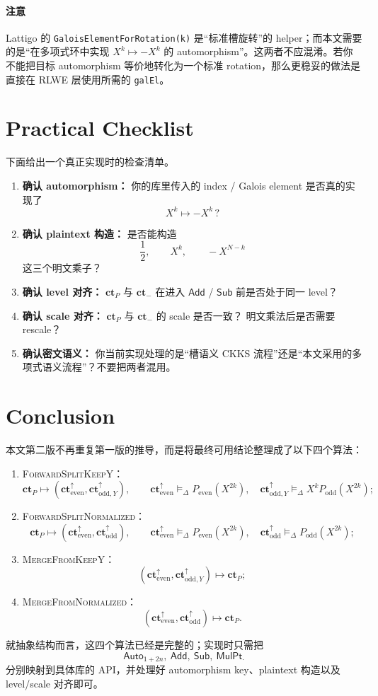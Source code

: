 \documentclass[11pt,a4paper]{ctexart}
\newcommand{\Auto}[1]{\mathsf{Auto}_{#1}}
\newcommand{\Add}{\mathsf{Add}}
\newcommand{\Sub}{\mathsf{Sub}}
\newcommand{\MulPt}[1]{\mathsf{MulPt}_{#1}}
\newcommand{\rep}{\mathrel{\vDash_{\Delta}}}
\newcommand{\ctP}{\mathbf{ct}_{P}}
\newcommand{\ctm}{\mathbf{ct}_{-}}
\newcommand{\cte}{\mathbf{ct}_{\mathrm{even}}^{\uparrow}}
\newcommand{\ctoy}{\mathbf{ct}_{\mathrm{odd},Y}^{\uparrow}}
\newcommand{\cto}{\mathbf{ct}_{\mathrm{odd}}^{\uparrow}}
\newcommand{\Pe}{P_{\mathrm{even}}}
\newcommand{\Po}{P_{\mathrm{odd}}}
\begin{document}
\paragraph{注意}
Lattigo 的 \texttt{GaloisElementForRotation(k)} 是“标准槽旋转”的 helper；而本文需要的是“在多项式环中实现 \(X^k\mapsto -X^k\) 的 automorphism”。这两者不应混淆。若你不能把目标 automorphism 等价地转化为一个标准 rotation，那么更稳妥的做法是直接在 RLWE 层使用所需的 \texttt{galEl}。

\section{Practical Checklist}

下面给出一个真正实现时的检查清单。

\begin{enumerate}[label=\textbf{C\arabic*.}]
    \item \textbf{确认 automorphism：}  
    你的库里传入的 index / Galois element 是否真的实现了
    \[
    X^k \mapsto -X^k \, ?
    \]

    \item \textbf{确认 plaintext 构造：}  
    是否能构造
    \[
    \frac12,\qquad X^k,\qquad -X^{N-k}
    \]
    这三个明文乘子？

    \item \textbf{确认 level 对齐：}  
    \(\ctP\) 与 \(\ctm\) 在进入 \(\Add\) / \(\Sub\) 前是否处于同一 level？

    \item \textbf{确认 scale 对齐：}  
    \(\ctP\) 与 \(\ctm\) 的 scale 是否一致？  
    明文乘法后是否需要 rescale？

    \item \textbf{确认密文语义：}  
    你当前实现处理的是“槽语义 CKKS 流程”还是“本文采用的多项式语义流程”？不要把两者混用。
\end{enumerate}

\section{Conclusion}

本文第二版不再重复第一版的推导，而是将最终可用结论整理成了以下四个算法：

\begin{enumerate}[label=(\arabic*)]
    \item \textsc{ForwardSplitKeepY}：
    \[
    \ctP \longmapsto (\cte,\ctoy),
    \qquad
    \cte \rep \Pe(X^{2k}),\quad
    \ctoy \rep X^k\Po(X^{2k});
    \]

    \item \textsc{ForwardSplitNormalized}：
    \[
    \ctP \longmapsto (\cte,\cto),
    \qquad
    \cte \rep \Pe(X^{2k}),\quad
    \cto \rep \Po(X^{2k});
    \]

    \item \textsc{MergeFromKeepY}：
    \[
    (\cte,\ctoy)\longmapsto \ctP;
    \]

    \item \textsc{MergeFromNormalized}：
    \[
    (\cte,\cto)\longmapsto \ctP.
    \]
\end{enumerate}

就抽象结构而言，这四个算法已经是完整的；实现时只需把
\[
\Auto{1+2n},\ \Add,\ \Sub,\ \MulPt{\cdot}
\]
分别映射到具体库的 API，并处理好 automorphism key、plaintext 构造以及 level/scale 对齐即可。
\end{document}
